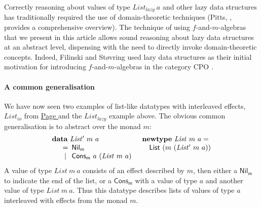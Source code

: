 \documentclass{jfp1}
\newcommand{\kw}[1]{\textbf{#1}}
\begin{document}
Correctly reasoning about values of type $\mathit{List_{lazy}}~a$ and
other lazy data structures has traditionally required the use of
domain-theoretic techniques (Pitts, \cite{pitts96relational}, provides
a comprehensive overview). The technique of using $f$-and-$m$-algebras
that we present in this article allows sound reasoning about lazy data
structures at an abstract level, dispensing with the need to directly
invoke domain-theoretic concepts. Indeed, Filinski and St\o{}vring
used lazy data structures as their initial motivation for introducing
$f$-and-$m$-algebras in the category CPO \cite{filinski07inductive}.

\paragraph{A common generalisation} We have now seen two examples of
list-like datatypes with interleaved effects, $\mathit{List_{io}}$
from \hyperref[defn:listio]{Page \pageref*{defn:listio}} and the
$\mathit{List_{lazy}}$ example above. The obvious common
generalisation is to abstract over the monad $m$:
\begin{displaymath}
  \begin{array}{ll}
    \kw{data}~\mathit{List'}~m~a
    &
    \kw{newtype}~\mathit{List}~m~a = 
    \\
    \quad
    \begin{array}[t]{c@{\hspace{0.5em}}l}
      = & \mathsf{Nil_m} \\
      | & \mathsf{Cons_m}~a~(\mathit{List}~m~a) \\
    \end{array}
    &
    \quad \mathsf{List}~(m~(\mathit{List'}~m~a))
  \end{array}
\end{displaymath}
A value of type $\mathit{List}~m~a$ consists of an effect described by
$m$, then either a $\mathsf{Nil_m}$ to indicate the end of the list,
or a $\mathsf{Cons_m}$ with a value of type $a$ and another value of
type $\mathit{List}~m~a$. Thus this datatype describes lists of values
of type $a$ interleaved with effects from the monad $m$.
\end{document}
